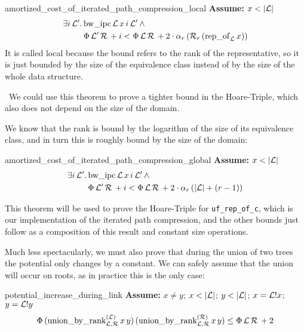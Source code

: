 \documentclass[headsepline,footsepline,footinclude=false,oneside,fontsize=11pt,paper=a4,listof=totoc,bibliography=totoc]{scrbook} %
\begin{document}
\begin{theorem}{amortized\_cost\_of\_iterated\_path\_compression\_local} \newline
	\textbf{Assume: } $x < |\mathcal{L}|$
	\begin{align}
	\begin{split}
	\exists i\, \mathcal{L}'.\,& \mathrm{bw\_ipc}\, \mathcal{L}\, x\, i\, \mathcal{L}'\, \land\\
	& \Phi\, \mathcal{L}'\, \mathcal{R}\, + i < \Phi\, \mathcal{L}\, \mathcal{R}\, + 2 \cdot \alpha_r\, (\mathcal{R}_r\, (\mathrm{rep\_of}_\mathcal{L}\, x))
	\end{split}
	\end{align}
	It is called local because the bound refers to the rank of the representative, so it is just bounded by the size of the equivalence class instead of by the size of the whole data structure. 
	
	\HandPencilLeft\, We could use this theorem to prove a tighter bound in the Hoare-Triple, which also does not depend on the size of the domain.
\end{theorem}

We know that the rank is bound by the logarithm of the size of its equivalence class, and in turn this is roughly bound by the size of the domain:

\begin{theorem}{amortized\_cost\_of\_iterated\_path\_compression\_global} \newline
	\textbf{Assume: } $x < |\mathcal{L}|$
	\begin{align}
	\begin{split}
	\exists i\, \mathcal{L}'.\,& \mathrm{bw\_ipc}\, \mathcal{L}\, x\, i\, \mathcal{L}'\, \land\\
	& \Phi\, \mathcal{L}'\, \mathcal{R}\, + i < \Phi\, \mathcal{L}\, \mathcal{R}\, + 2 \cdot \alpha_r\, (|\mathcal{L}| + (r - 1))
	\end{split}
	\end{align}
\end{theorem}

This theorem will be used to prove the Hoare-Triple for \verb|uf_rep_of_c|, which is our implementation of the iterated path compression, and the other bounds just follow as a composition of this result and constant size operations.

Much less spectacularly, we must also prove that during the union of two trees the potential only changes by a constant. We can safely assume that the union will occur on roots, as in practice this is the only case:

\begin{theorem}{potential\_increase\_during\_link} \newline
	\textbf{Assume: } $x \neq y$; $x<|\LL|$; $y<|\LL|$; $x=\mathcal{L}!x$; $y=\mathcal{L}!y$
	\begin{equation}
	\Phi\, (\mathrm{union\_by\_rank}_{\mathcal{L},\mathcal{R}}^{(\mathcal{L})}\,x\,y) \, (\mathrm{union\_by\_rank}_{\mathcal{L},\mathcal{R}}^{(\mathcal{R})}\,x\,y) \leq \Phi\, \mathcal{L}\, \mathcal{R}\, + 2
	\end{equation}
\end{theorem}
\end{document}
